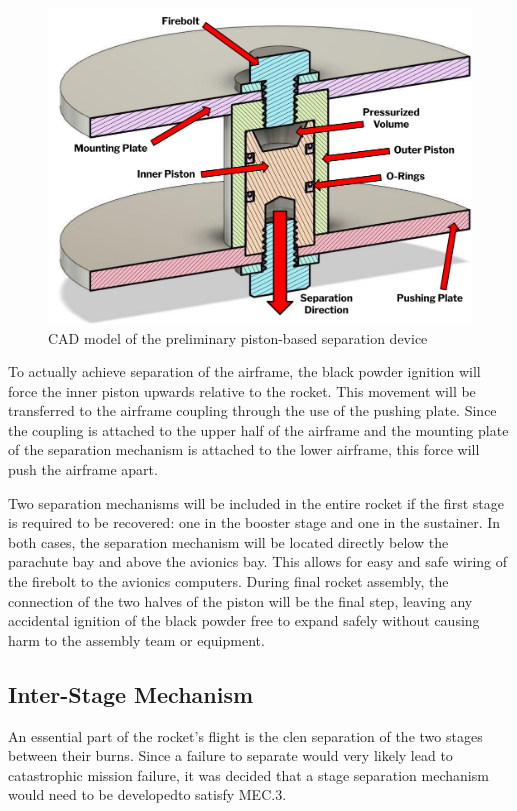 \begin{figure}
    \centering
    \includegraphics[width=0.8\linewidth]{images/sep-cad}
    \caption{CAD model of the preliminary piston-based separation device}
    \label{figure:sep-cad}
\end{figure}

To actually achieve separation of the airframe, the black powder ignition will force the inner piston upwards relative to the rocket. This movement will be transferred to the airframe coupling through the use of the pushing plate. Since the coupling is attached to the upper half of the airframe and the mounting plate of the separation mechanism is attached to the lower airframe, this force will push the airframe apart.

Two separation mechanisms will be included in the entire rocket if the first stage is required to be recovered: one in the booster stage and one in the sustainer. In both cases, the separation mechanism will be located directly below the parachute bay and above the avionics bay. This allows for easy and safe wiring of the firebolt to the avionics computers. During final rocket assembly, the connection of the two halves of the piston will be the final step, leaving any accidental ignition of the black powder free to expand safely without causing harm to the assembly team or equipment.


\subsection{Inter-Stage Mechanism}

An essential part of the rocket's flight is the clen separation of the two stages between their burns. Since a failure to separate would very likely lead to catastrophic mission failure, it was decided that a stage separation mechanism would need to be developedto satisfy MEC.3.

